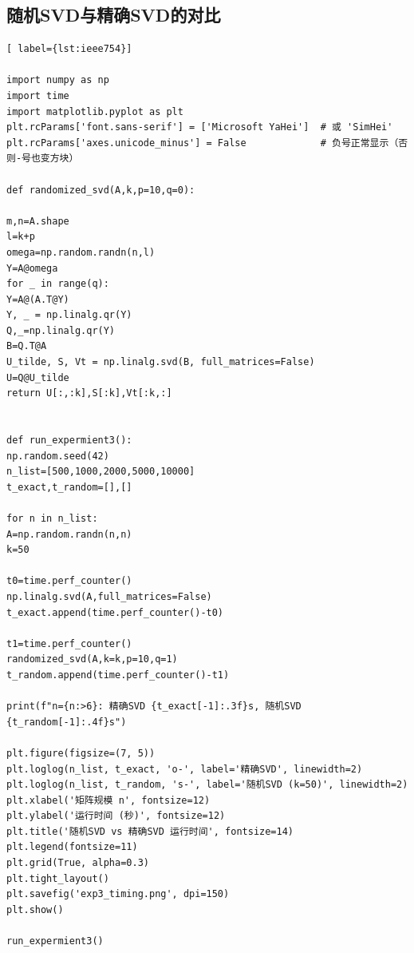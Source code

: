 \documentclass{article}
\begin{document}
	
\subsection{随机SVD与精确SVD的对比}
\begin{lstlisting}[ label={lst:ieee754}]

import numpy as np
import time
import matplotlib.pyplot as plt
plt.rcParams['font.sans-serif'] = ['Microsoft YaHei']  # 或 'SimHei'
plt.rcParams['axes.unicode_minus'] = False             # 负号正常显示（否则-号也变方块）

def randomized_svd(A,k,p=10,q=0):

m,n=A.shape
l=k+p
omega=np.random.randn(n,l)
Y=A@omega
for _ in range(q):  
Y=A@(A.T@Y)     
Y, _ = np.linalg.qr(Y)
Q,_=np.linalg.qr(Y)
B=Q.T@A
U_tilde, S, Vt = np.linalg.svd(B, full_matrices=False)
U=Q@U_tilde
return U[:,:k],S[:k],Vt[:k,:]


def run_expermient3():
np.random.seed(42)
n_list=[500,1000,2000,5000,10000]
t_exact,t_random=[],[]

for n in n_list:
A=np.random.randn(n,n)
k=50

t0=time.perf_counter()
np.linalg.svd(A,full_matrices=False)
t_exact.append(time.perf_counter()-t0)

t1=time.perf_counter()
randomized_svd(A,k=k,p=10,q=1)
t_random.append(time.perf_counter()-t1)

print(f"n={n:>6}: 精确SVD {t_exact[-1]:.3f}s, 随机SVD {t_random[-1]:.4f}s")

plt.figure(figsize=(7, 5))
plt.loglog(n_list, t_exact, 'o-', label='精确SVD', linewidth=2)
plt.loglog(n_list, t_random, 's-', label='随机SVD (k=50)', linewidth=2)
plt.xlabel('矩阵规模 n', fontsize=12)
plt.ylabel('运行时间 (秒)', fontsize=12)
plt.title('随机SVD vs 精确SVD 运行时间', fontsize=14)
plt.legend(fontsize=11)
plt.grid(True, alpha=0.3)
plt.tight_layout()
plt.savefig('exp3_timing.png', dpi=150)
plt.show()

run_expermient3()




\end{lstlisting}

	
\end{document}
